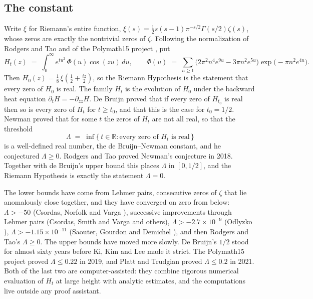 \documentclass[11pt]{article}
\theoremstyle{definition}
\newcommand{\Lam}{\Lambda}
\newcommand{\Hfun}{H}
\newcommand{\R}{\mathbb{R}}
\begin{document}
\subsection{The constant}

Write $\xi$ for Riemann's entire function, $\xi(s) = \tfrac12 s(s-1)\pi^{-s/2}\Gamma(s/2)\zeta(s)$, whose zeros are exactly the nontrivial zeros of $\zeta$. Following the normalization of Rodgers and Tao \cite{RT} and of the Polymath15 project \cite{P15}, put
\begin{equation}\label{eq:H}
\Hfun_t(z) \;=\; \int_0^\infty e^{t u^2}\,\Phi(u)\cos(zu)\,du,
\qquad
\Phi(u) \;=\; \sum_{n \ge 1}\bigl(2\pi^2 n^4 e^{9u} - 3\pi n^2 e^{5u}\bigr)\exp\!\bigl(-\pi n^2 e^{4u}\bigr).
\end{equation}
Then $\Hfun_0(z) = \tfrac18\,\xi\!\left(\tfrac12 + \tfrac{iz}{2}\right)$, so the Riemann Hypothesis is the statement that every zero of $\Hfun_0$ is real. The family $\Hfun_t$ is the evolution of $\Hfun_0$ under the backward heat equation $\partial_t \Hfun = -\partial_{zz}\Hfun$. De Bruijn \cite{dB} proved that if every zero of $\Hfun_{t_0}$ is real then so is every zero of $\Hfun_t$ for $t \ge t_0$, and that this is the case for $t_0 = 1/2$. Newman \cite{Ne} proved that for some $t$ the zeros of $\Hfun_t$ are not all real, so that the threshold
\[
\Lam \;=\; \inf\{\,t \in \R : \text{every zero of } \Hfun_t \text{ is real}\,\}
\]
is a well-defined real number, the de Bruijn--Newman constant, and he conjectured $\Lam \ge 0$. Rodgers and Tao \cite{RT} proved Newman's conjecture in 2018. Together with de Bruijn's upper bound this places $\Lam$ in $[0, 1/2]$, and the Riemann Hypothesis is exactly the statement $\Lam = 0$.

The lower bounds have come from Lehmer pairs, consecutive zeros of $\zeta$ that lie anomalously close together, and they have converged on zero from below: $\Lam > -50$ (Csordas, Norfolk and Varga \cite{CNV}), successive improvements through Lehmer pairs (Csordas, Smith and Varga \cite{CSV} and others), $\Lam > -2.7 \times 10^{-9}$ (Odlyzko \cite{Od}), $\Lam > -1.15 \times 10^{-11}$ (Saouter, Gourdon and Demichel \cite{SGD}), and then Rodgers and Tao's $\Lam \ge 0$. The upper bounds have moved more slowly. De Bruijn's $1/2$ stood for almost sixty years before Ki, Kim and Lee \cite{KKL} made it strict. The Polymath15 project \cite{P15} proved $\Lam \le 0.22$ in 2019, and Platt and Trudgian \cite{PT} proved $\Lam \le 0.2$ in 2021. Both of the last two are computer-assisted: they combine rigorous numerical evaluation of $\Hfun_t$ at large height with analytic estimates, and the computations live outside any proof assistant.
\end{document}
